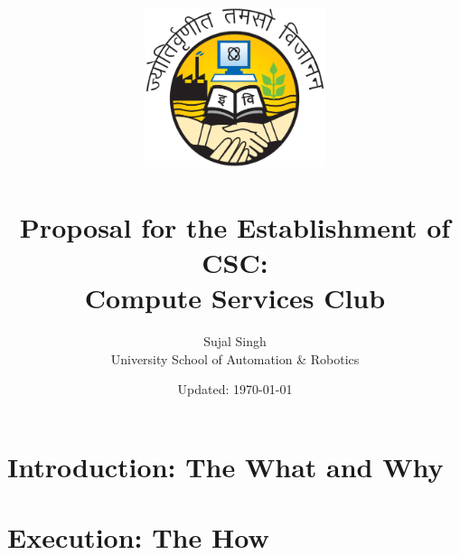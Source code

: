\documentclass[a4paper,11pt,twocolumn,oneside]{book}
\title{
    \includegraphics[width=150pt]{./images/ipu}
    \\
    \textbf{\\Proposal for the Establishment of CSC: \\ Compute Services Club}
}
\author{Sujal Singh \\ University School of Automation \& Robotics}
\date{Updated: \today}
\begin{document}
    \maketitle
    
    \tableofcontents


    \chapter{Introduction: The What and Why}\label{ch:introduction}
    


    \chapter{Execution: The How}\label{ch:execution:-the-how}
    
\end{document}
